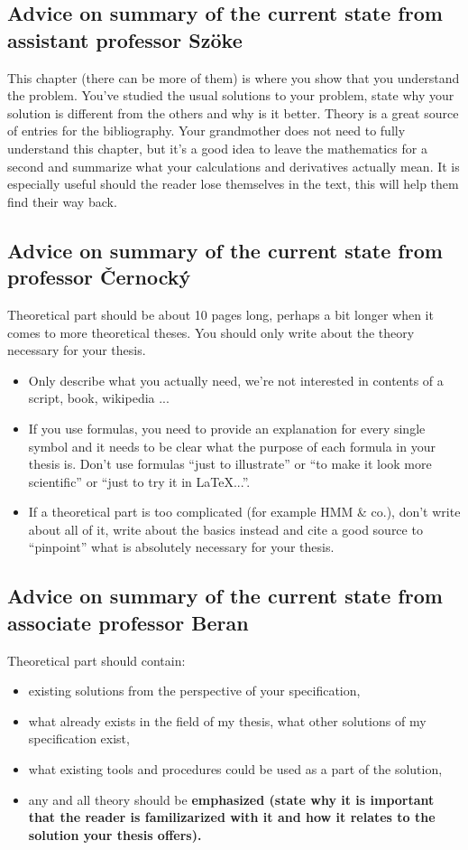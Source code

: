 \subsection{Advice on summary of the current state from assistant professor Szöke}

This chapter (there can be more of them) is where you show that you understand the problem. You've studied the usual solutions to your problem, state why your solution is different from the others and why is it better. Theory is a great source of entries for the bibliography. Your grandmother does not need to fully understand this chapter, but it's a good idea to leave the mathematics for a second and summarize what your calculations and derivatives actually mean. It is especially useful should the reader lose themselves in the text, this will help them find their way back.

\subsection{Advice on summary of the current state from professor Černocký}

Theoretical part should be about 10 pages long, perhaps a bit longer when it comes to more theoretical theses. You should only write about the theory necessary for your thesis.
\begin{itemize}
  \item{Only describe what you actually need, we're not interested in contents of a script, book, wikipedia ...}
  \item{If you use formulas, you need to provide an explanation for every single symbol and it needs to be clear what the purpose of each formula in your thesis is. Don't use formulas ``just to illustrate'' or ``to make it look more scientific'' or ``just to try it in LaTeX...''. }
  \item{If a theoretical part is too complicated (for example HMM \& co.), don't write about all of it, write about the basics instead and cite a good source to ``pinpoint'' what is absolutely necessary for your thesis.}
\end{itemize}


\subsection{Advice on summary of the current state from associate professor Beran}

Theoretical part should contain:
\begin{itemize}
  \item{existing solutions from the perspective of your specification,}
  \item{what already exists in the field of my thesis, what other solutions of my specification exist,}
  \item{what existing tools and procedures could be used as a part of the solution,}
  \item{any and all theory should be \bf emphasized \rm (state why it is important that the reader is familizarized with it and how it relates to the solution your thesis offers).}
\end{itemize}
    

